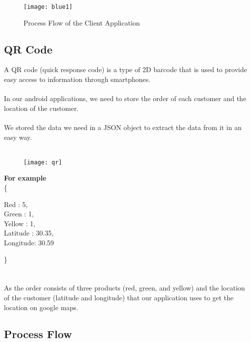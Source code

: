 \begin{figure}[h]
    \texttt{[image: blue1]}
    \centering
    \caption{Process Flow of the Client Application}
    \label{fig:blue1}
\end{figure}

\subsection{QR Code}
A QR code (quick response code) is a type of 2D barcode that is used to provide easy access to
information through smartphones.\\\\
In our android applications, we need to store the order of each customer and the location of the
customer.\\\\
We stored the data we need in a JSON object to extract the data from it in an easy way.\\\\

\par\vspace {4cm}
\begin{wrapfigure}{r}{0.5\textwidth}
    \begin{center}
      \texttt{[image: qr]}
    \end{center}
  \end{wrapfigure}

\textbf{For example}\\
\small \{
    \begin{adjustwidth}{2cm}{}
    \small Red : 5,\\
    \small Green : 1,\\
    \small Yellow : 1,\\
    \small Latitude : 30.35,\\
    \small Longitude: 30.59\\
    \end{adjustwidth}

    \small \}\\\\\\

    As the order consists of three products (red, green, and
    yellow) and the location of the customer (latitude and
    longitude) that our application uses to get the location on
    google maps.

\subsection{Process Flow}

